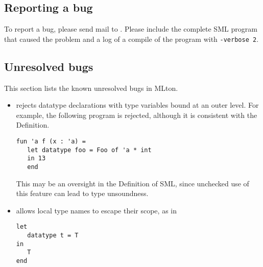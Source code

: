 %
\subsection{Reporting a bug}

To report a bug, please send mail to {\mltonmail}.  Please include the
complete SML program that caused the problem and a log of a compile of
the program with {\tt -verbose 2}.
%
\subsection{Unresolved bugs}

This section lists the known unresolved bugs in MLton.

\begin{itemize}

\item
{\mlton} rejects datatype declarations with type variables bound at
an outer level.  For example, the following program is rejected,
although it is consistent with the Definition.
\begin{verbatim}
fun 'a f (x : 'a) =
   let datatype foo = Foo of 'a * int
   in 13
   end
\end{verbatim}
This may be an oversight in the Definition of SML, since unchecked use
of this feature can lead to type unsoundness.

\item
{\mlton} allows local type names to escape their scope, as in
\begin{verbatim}
let
   datatype t = T
in
   T
end
\end{verbatim}

\end{itemize}
